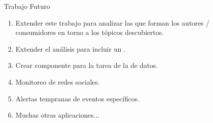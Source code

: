 \begin{tframe}{Trabajo Futuro}
	\begin{enumerate}
		\item Extender este trabajo para analizar las  que forman los autores / consumidores en torno a los tópicos descubiertos.
		\item Extender el análisis para incluir un .
		\item Crear componente para la tarea de la  de datos.
		\item Monitoreo de redes sociales.
		\item Alertas tempranas de eventos específicos.
		\item Muchas otras aplicaciones$\dots$
	\end{enumerate}
\end{tframe}



